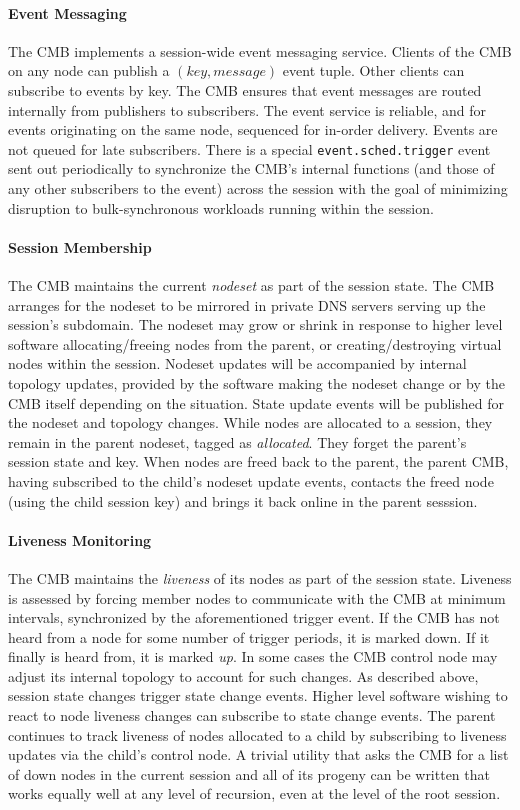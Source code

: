\paragraph{Event Messaging}
The CMB implements a session-wide event messaging service.
Clients of the CMB on any node can publish a $(key, message)$ event tuple.
Other clients can subscribe to events by key.  The CMB ensures that
event messages are routed internally from publishers to subscribers.
The event service is reliable, and for events originating on the same node,
sequenced for in-order delivery.
Events are not queued for late subscribers.
There is a special {\tt event.sched.trigger} event sent out periodically
to synchronize the CMB's internal functions (and those of any other
subscribers to the event) across the session with the goal of minimizing
disruption to bulk-synchronous workloads running within the session.

\paragraph{Session Membership}
The CMB maintains the current {\em nodeset} as part of the session state.
The CMB arranges for the nodeset to be mirrored in private DNS servers
serving up the session's subdomain.
The nodeset may grow or shrink in response to higher level software
allocating/freeing nodes from the parent, or creating/destroying 
virtual nodes within the session.
Nodeset updates will be accompanied by internal topology updates, provided by
the software making the nodeset change or by the CMB itself depending
on the situation.
State update events will be published for the nodeset and topology changes.
While nodes are allocated to a session, they remain in the parent nodeset,
tagged as {\em allocated}.  They forget the parent's session state and key.
When nodes are freed back to the parent, the parent CMB, having subscribed
to the child's nodeset update events, contacts the freed node (using the
child session key) and brings it back online in the parent sesssion.  

\paragraph{Liveness Monitoring}
The CMB maintains the {\em liveness} of its nodes as part
of the session state.
Liveness is assessed by forcing member nodes to communicate with the CMB
at minimum intervals, synchronized by the aforementioned trigger event.
If the CMB has not heard from a node for some number
of trigger periods, it is marked down.
If it finally is heard from, it is marked {\em up}.
In some cases the CMB control node may adjust its internal topology
to account for such changes.
As described above, session state changes trigger state change events.
Higher level software wishing to react to node liveness changes can
subscribe to state change events.
The parent continues to track liveness of nodes allocated to a child by
subscribing to liveness updates via the child's control node.  A trivial
utility that asks the CMB for a list of down nodes in the current session
and all of its progeny can be written that works equally well at any level of recursion,
even at the level of the root session.

